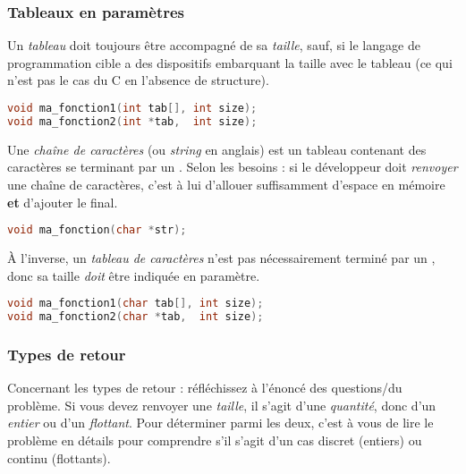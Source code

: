 \documentclass[11pt,a4paper]{article}
\begin{document}
\subsubsection{Tableaux en paramètres}

Un \textit{tableau} doit toujours être accompagné de sa \textit{taille}, sauf, si le langage de programmation cible a des dispositifs embarquant la taille avec le tableau (ce qui n'est pas le cas du C en l'absence de structure).

\medskip

\begin{lstlisting}[language=C]
void ma_fonction1(int tab[], int size);
void ma_fonction2(int *tab,  int size); \end{lstlisting}

\vspace*{-0.5cm}

Une \textit{chaîne de caractères} (ou \textit{string} en anglais) est un tableau contenant des caractères se terminant par un \og {} \fg{}.
Selon les besoins : si le développeur doit \textit{renvoyer} une chaîne de caractères, c'est à lui d'allouer suffisamment d'espace en mémoire \textbf{et} d'ajouter le \og {} \fg{} final.

\medskip

\begin{lstlisting}[language=C]
void ma_fonction(char *str); \end{lstlisting}

\vspace*{-0.5cm}

\`A l'inverse, un \textit{tableau de caractères} n'est pas nécessairement terminé par un \og {} \fg{}, donc sa taille \textit{doit} être indiquée en paramètre.

\medskip

\begin{lstlisting}[language=C]
void ma_fonction1(char tab[], int size);
void ma_fonction2(char *tab,  int size); \end{lstlisting}

\vspace*{-0.5cm}

\subsubsection{Types de retour}

Concernant les types de retour : réfléchissez à l'énoncé des questions/du problème.
Si vous devez renvoyer une \textit{taille}, il s'agit d'une \textit{quantité}, donc d'un \textit{entier} ou d'un \textit{flottant}.
Pour déterminer parmi les deux, c'est à vous de lire le problème en détails pour comprendre s'il s'agit d'un cas discret (entiers) ou continu (flottants).
\end{document}
